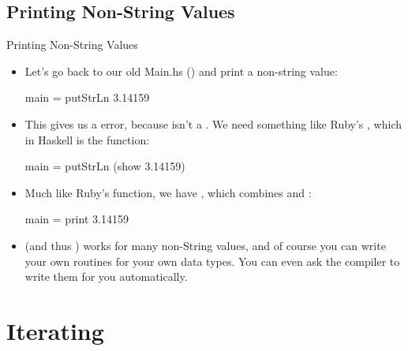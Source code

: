 \documentclass[xcolor=dvipsnames]{beamer}          %
\begin{document}
\subsection{Printing Non-String Values}

\begin{frame}[fragile]{Printing Non-String Values}
\begin{itemize}
    \item Let's go back to our old Main.hs () and
        print a non-string value:
        \begin{hlisting}
            main = putStrLn 3.14159
        \end{hlisting}
    \item This gives us a error, because  isn't a .
        We need something like Ruby's , which in Haskell is
        the  function:
        \begin{hlisting}
            main = putStrLn (show 3.14159)
        \end{hlisting}
    \item Much like Ruby's  function, we have , which
        combines  and :
        \begin{hlisting}
            main = print 3.14159
        \end{hlisting}
    \item {} (and thus ) works for many non-String values,
        and of course you can write your own routines for your own data
        types. You can even ask the compiler to write them for you
        automatically.
\end{itemize}
\end{frame}


\section{Iterating}
\end{document}

